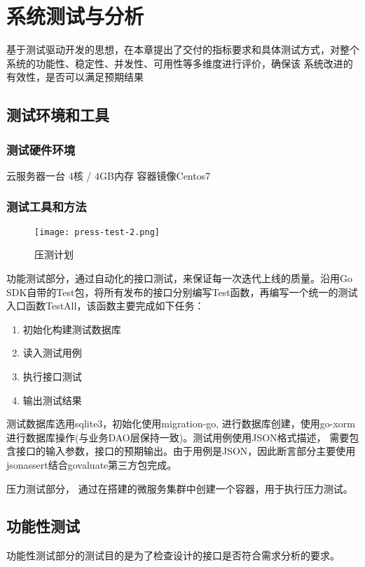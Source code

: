 
\chapter{系统测试与分析}
基于测试驱动开发的思想，在本章提出了交付的指标要求和具体测试方式，对整个系统的功能性、稳定性、并发性、可用性等多维度进行评价，确保该
系统改进的有效性，是否可以满足预期结果

\section{测试环境和工具}

\subsection{测试硬件环境}
云服务器一台
4核 / 4GB内存
容器镜像Centos7

\subsection{测试工具和方法}


\begin{figure}[H]
    \centering
    \texttt{[image: press-test-2.png]}
    \caption{压测计划}
    \label{fig:6-1-2}
\end{figure}

功能测试部分，通过自动化的接口测试，来保证每一次迭代上线的质量\cite{zw3}。沿用Go SDK自带的Test包，将所有发布的接口分别编写Test函数，再编写一个统一的测试
入口函数TestAll，该函数主要完成如下任务：
\begin{enumerate}
    \item 初始化构建测试数据库
    \item 读入测试用例
    \item 执行接口测试
    \item 输出测试结果
\end{enumerate}

测试数据库选用sqlite3，初始化使用migration-go, 进行数据库创建，使用go-xorm进行数据库操作(与业务DAO层保持一致)。测试用例使用JSON格式描述，
需要包含接口的输入参数，接口的预期输出。由于用例是JSON，因此断言部分主要使用jsonassert结合govaluate第三方包完成。

压力测试部分， 通过在搭建的微服务集群中创建一个容器，用于执行压力测试\cite{zw4}。


\section{功能性测试}
功能性测试部分的测试目的是为了检查设计的接口是否符合需求分析的要求。
